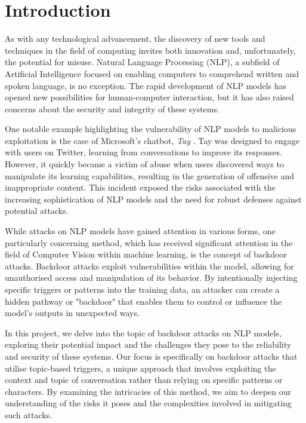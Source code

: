 \chapter{Introduction}

As with any technological advancement, the discovery of new tools and techniques in the field of computing invites both innovation and, unfortunately, the potential for misuse. Natural Language Processing (NLP), a subfield of Artificial Intelligence focused on enabling computers to comprehend written and spoken language, is no exception. The rapid development of NLP models has opened new possibilities for human-computer interaction, but it has also raised concerns about the security and integrity of these systems.

One notable example highlighting the vulnerability of NLP models to malicious exploitation is the case of Microsoft's chatbot, \textit{Tay} \cite{tay}. Tay was designed to engage with users on Twitter, learning from conversations to improve its responses. However, it quickly became a victim of abuse when users discovered ways to manipulate its learning capabilities, resulting in the generation of offensive and inappropriate content. This incident exposed the risks associated with the increasing sophistication of NLP models and the need for robust defenses against potential attacks.

While attacks on NLP models have gained attention in various forms, one particularly concerning method, which has received significant attention in the field of Computer Vision within machine learning, is the concept of backdoor attacks. Backdoor attacks exploit vulnerabilities within the model, allowing for unauthorised access and manipulation of its behavior. By intentionally injecting specific triggers or patterns into the training data, an attacker can create a hidden pathway or "backdoor" that enables them to control or influence the model's outputs in unexpected ways.

In this project, we delve into the topic of backdoor attacks on NLP models, exploring their potential impact and the challenges they pose to the reliability and security of these systems. Our focus is specifically on backdoor attacks that utilise topic-based triggers, a unique approach that involves exploiting the context and topic of conversation rather than relying on specific patterns or characters. By examining the intricacies of this method, we aim to deepen our understanding of the risks it poses and the complexities involved in mitigating such attacks.

